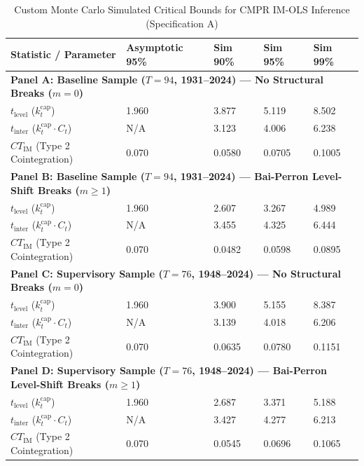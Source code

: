 \FloatBarrier
\begin{table}[h!]
\centering
\caption{Custom Monte Carlo Simulated Critical Bounds for CMPR IM-OLS Inference (Specification A)}
\label{tab:appendixD_specA_mc_bounds}
\begin{tabular}{p{4.2cm} p{2.6cm} p{2.2cm} p{2.2cm} p{2.2cm}}
\toprule
\textbf{Statistic / Parameter} & \textbf{Asymptotic 95\%} & \textbf{Sim 90\%} & \textbf{Sim 95\%} & \textbf{Sim 99\%} \\
\midrule
\multicolumn{5}{l}{\textbf{Panel A: Baseline Sample ($T=94$, 1931--2024) --- No Structural Breaks ($m=0$)}} \\
\midrule
$t_{\text{level}}$ ($k_t^{\text{cap}}$) & 1.960 & 3.877 & 5.119 & 8.502 \\
$t_{\text{inter}}$ ($k_t^{\text{cap}} \cdot C_t$) & N/A & 3.123 & 4.006 & 6.238 \\
$CT_{\text{IM}}$ (Type 2 Cointegration) & 0.070 & 0.0580 & 0.0705 & 0.1005 \\
\midrule
\multicolumn{5}{l}{\textbf{Panel B: Baseline Sample ($T=94$, 1931--2024) --- Bai-Perron Level-Shift Breaks ($m \ge 1$)}} \\
\midrule
$t_{\text{level}}$ ($k_t^{\text{cap}}$) & 1.960 & 2.607 & 3.267 & 4.989 \\
$t_{\text{inter}}$ ($k_t^{\text{cap}} \cdot C_t$) & N/A & 3.455 & 4.325 & 6.444 \\
$CT_{\text{IM}}$ (Type 2 Cointegration) & 0.070 & 0.0482 & 0.0598 & 0.0895 \\
\midrule
\multicolumn{5}{l}{\textbf{Panel C: Supervisory Sample ($T=76$, 1948--2024) --- No Structural Breaks ($m=0$)}} \\
\midrule
$t_{\text{level}}$ ($k_t^{\text{cap}}$) & 1.960 & 3.900 & 5.155 & 8.387 \\
$t_{\text{inter}}$ ($k_t^{\text{cap}} \cdot C_t$) & N/A & 3.139 & 4.018 & 6.206 \\
$CT_{\text{IM}}$ (Type 2 Cointegration) & 0.070 & 0.0635 & 0.0780 & 0.1151 \\
\midrule
\multicolumn{5}{l}{\textbf{Panel D: Supervisory Sample ($T=76$, 1948--2024) --- Bai-Perron Level-Shift Breaks ($m \ge 1$)}} \\
\midrule
$t_{\text{level}}$ ($k_t^{\text{cap}}$) & 1.960 & 2.687 & 3.371 & 5.188 \\
$t_{\text{inter}}$ ($k_t^{\text{cap}} \cdot C_t$) & N/A & 3.427 & 4.277 & 6.213 \\
$CT_{\text{IM}}$ (Type 2 Cointegration) & 0.070 & 0.0545 & 0.0696 & 0.1065 \\

\end{tabular}
\end{table}
